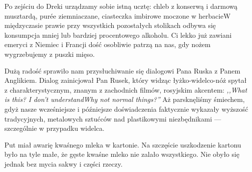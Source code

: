 


Po zejściu do Dreki urządzamy sobie istną ucztę: chleb z konserwą i darmową musztardą, purée ziemniaczane, ciasteczka imbirowe moczone w herbacie\textellipsis W międzyczasie prawie przy wszystkich pozostałych stolikach odbywa się konsumpcja mniej lub bardziej procentowego alkoholu. Ci lekko już zawiani emeryci z Niemiec i Francji dość osobliwie patrzą na nas, gdy nożem wygrzebujemy z puszki mięso.

Dużą radość sprawiło nam przysłuchiwanie się dialogowi Pana Ruska z Panem Anglikiem. Dialog zainicjował Pan Rusek, który widząc łyżko-widelco-nóż spytał z charakterystycznym, znanym z zachodnich filmów, rosyjskim akcentem: \emph{,,What is this? I don’t understand\textellipsis Why not normal things?''} Aż parsknęliśmy śmiechem, gdyż nasze wcześniejsze i późniejsze doświadczenia faktycznie wykazały wyższość tradycyjnych, metalowych sztućców nad plastikowymi niezbędnikami --- szczególnie w przypadku widelca.

Put miał awarię kwaśnego mleka w kartonie. Na szczęście uszkodzenie kartonu było na tyle małe, że gęste kwaśne mleko nie zalało wszystkiego. Nie obyło się jednak bez mycia sakwy i części rzeczy.



